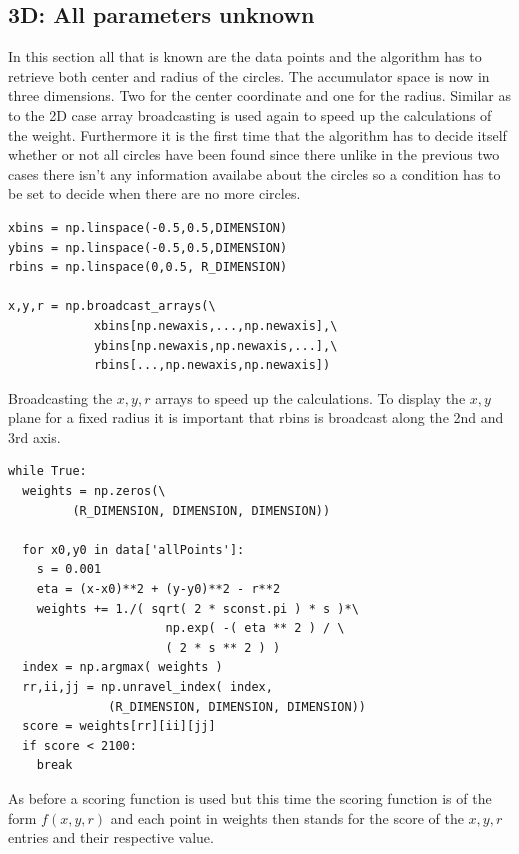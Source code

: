 \documentclass[11pt,twoside]{scrreprt}
\begin{document}
\subsection{3D: All parameters unknown} %
\label{sub:3d_nothing_is_known_find_everything}
In this section all that is known are the data points and the algorithm has to retrieve both center and radius of the circles. The accumulator space
is now in three dimensions. Two for the center coordinate and one for the radius. Similar as to the 2D case array broadcasting is used again
to speed up the calculations of the weight. Furthermore it is the first time that the algorithm has to decide itself whether or not all circles have
been found since there unlike in the previous two cases there isn't any information availabe about the circles so a condition has to be set
to decide when there are no more circles.
\begin{lstlisting}
xbins = np.linspace(-0.5,0.5,DIMENSION)
ybins = np.linspace(-0.5,0.5,DIMENSION)
rbins = np.linspace(0,0.5, R_DIMENSION)

x,y,r = np.broadcast_arrays(\
            xbins[np.newaxis,...,np.newaxis],\
            ybins[np.newaxis,np.newaxis,...],\
            rbins[...,np.newaxis,np.newaxis])
\end{lstlisting}
Broadcasting the $x,y,r$ arrays to speed up the calculations. To display the $x,y$ plane for a fixed radius it is important that rbins is
broadcast along the 2nd and 3rd axis. 
\begin{lstlisting}
while True:
  weights = np.zeros(\
         (R_DIMENSION, DIMENSION, DIMENSION))

  for x0,y0 in data['allPoints']:
    s = 0.001
    eta = (x-x0)**2 + (y-y0)**2 - r**2
    weights += 1./( sqrt( 2 * sconst.pi ) * s )*\
                      np.exp( -( eta ** 2 ) / \
                      ( 2 * s ** 2 ) )
  index = np.argmax( weights )
  rr,ii,jj = np.unravel_index( index, 
              (R_DIMENSION, DIMENSION, DIMENSION))
  score = weights[rr][ii][jj]
  if score < 2100:
    break  
\end{lstlisting}
As before a scoring function is used but this time the scoring function is of the form $f(x,y,r)$ and each point in weights then stands for the score of the
$x,y,r$ entries and their respective value.
\end{document}
